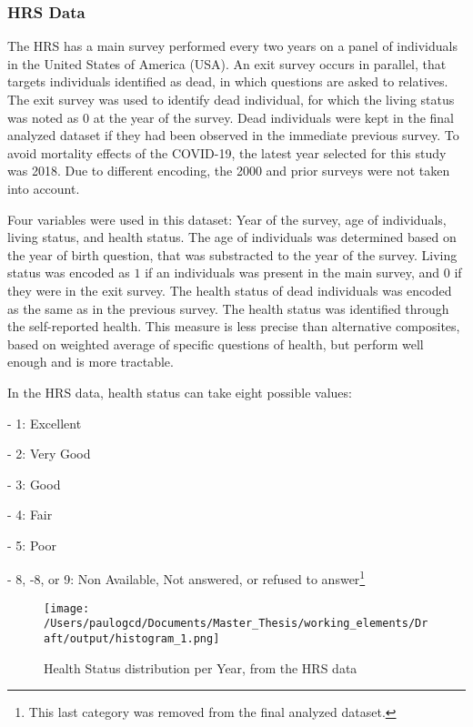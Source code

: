 \documentclass{article}
\begin{document}
\subsubsection{HRS Data}

The HRS has a main survey performed every two years on a panel of individuals in the United States of America (USA). 
An exit survey occurs in parallel, that targets individuals identified as dead, in which questions are asked to relatives.
The exit survey was used to identify dead individual, for which the living status was noted as $0$ at the year of the survey. 
Dead individuals were kept in the final analyzed dataset if they had been observed in the immediate previous survey. 
To avoid mortality effects of the COVID-19, the latest year selected for this study was 2018.
Due to different encoding, the 2000 and prior surveys were not taken into account. 

Four variables were used in this dataset: Year of the survey, age of individuals, living status, and health status.
The age of individuals was determined based on the year of birth question, that was substracted to the year of the survey. 
Living status was encoded as $1$ if an individuals was present in the main survey, and $0$ if they were in the exit survey.
The health status of dead individuals was encoded as the same as in the previous survey. 
The health status was identified through the self-reported health.
This measure is less precise than alternative composites, based on weighted average of specific questions of health, 
but perform well enough and is more tractable.

In the HRS data, health status can take eight possible values: 


- 1: Excellent

- 2: Very Good

- 3: Good

- 4: Fair

- 5: Poor

- 8, -8, or 9: Non Available, Not answered, or refused to answer\footnote{This last category was removed from the final analyzed dataset.}\\





\begin{figure}[H]
    \texttt{[image: /Users/paulogcd/Documents/Master\_Thesis/working\_elements/Draft/output/histogram\_1.png]}
    \caption{Health Status distribution per Year, from the HRS data}
    
    
\end{figure}
\end{document}
